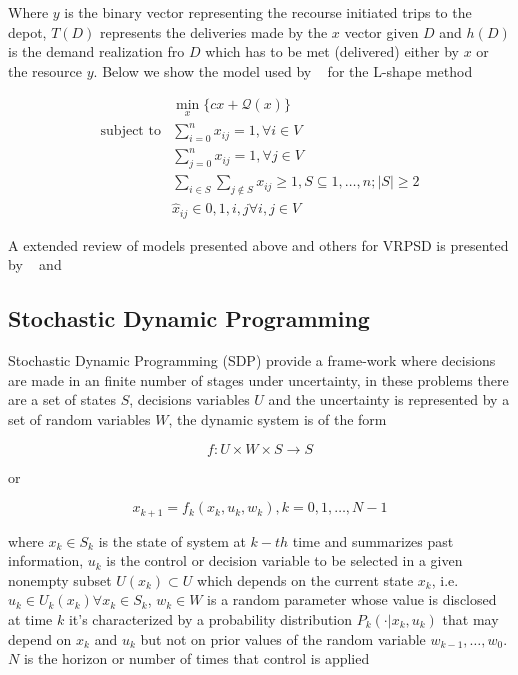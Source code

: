 Where $y$ is the binary vector representing the recourse initiated trips to the depot, $T(D)$ represents the deliveries made by the $x$ vector given $D$ and $h(D)$ is the demand realization fro $D$ which has to be met (delivered) either by $x$ or the resource $y$. Below we show the model used by ~\cite{laporte_integer_2002} for the L-shape method

\begin{align}\label{eq:SPR_lshape}
  & \min\limits_{x} \{cx+\mathcal{Q}(x)\}\\ 
 \text{subject to} & \sum_{i=0}^nx_{ij} = 1, \forall i \in V\\
  & \sum_{j=0}^nx_{ij} = 1, \forall j \in V\\
  & \sum_{i\in S}\sum_{j\notin S}x_{ij} \geq 1, S\subseteq {1,\ldots,n};|S|\geq2\\
  & \hat{x}_{ij} \in {0,1}, i,j \forall i,j \in V
\end{align}

A extended review of models presented above and others for VRPSD is presented by ~\cite{Dror_2005} and ~\cite{Dror1993432}

\subsection{Stochastic Dynamic Programming}

Stochastic Dynamic Programming (SDP) provide a frame-work where decisions are made in an finite number of stages under uncertainty, in these problems there are a set of states $S$, decisions variables $U$ and the uncertainty is represented by a set of random variables $W$, the dynamic system is of the form

\[f: U\times W \times S \rightarrow S\]

 or

\begin{equation}\label{eq:system_dynamic_decisions}
x_{k+1}=f_k(x_k,u_k,w_k), k=0,1,\ldots,N-1 
\end{equation}


where $x_k \in S_k$ is the state of system at $k-th$ time and summarizes past information, $u_k$ is the control or decision variable to be selected in a given nonempty subset $U(x_k) \subset U$ which depends on the current state $x_k$, i.e. $u_k \in U_k(x_k) \forall x_k \in S_k$, $w_k \in W$ is a random parameter whose value is disclosed at time $k$ it's characterized by a probability distribution $P_k(\cdot|x_k,u_k)$ that may depend on $x_k$ and $u_k$ but not on prior values of the random variable $w_{k-1},\ldots,w_0$. $N$ is the horizon or number of times that control is applied


